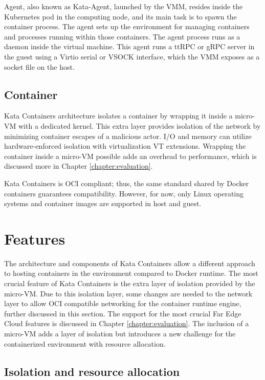 Agent, also known as Kata-Agent, launched by the VMM, resides inside the Kubernetes pod in the computing node, and its main task is to spawn the container process. The agent sets up the environment for managing containers and processes running within those containers. The agent process runs as a daemon inside the virtual machine. This agent runs a ttRPC or gRPC server in the guest using a Virtio serial or VSOCK interface, which the VMM exposes as a socket file on the host. \cite{KataContainersArchitecture}

\subsection{Container}

Kata Containers architecture isolates a container by wrapping it inside a micro-VM with a dedicated kernel. This extra layer provides isolation of the network by minimizing container escapes of a malicious actor. I/O and memory can utilize hardware-enforced isolation with virtualization VT extensions. Wrapping the container inside a micro-VM possible adds an overhead to performance, which is discussed more in Chapter \ref{chapter:evaluation}. \cite{KataContainers}

Kata Containers is OCI compliant; thus, the same standard shared by Docker containers guarantees compatibility. However, for now, only Linux operating systems and container images are supported in host and guest.

\section{Features}

The architecture and components of Kata Containers allow a different approach to hosting containers in the environment compared to Docker runtime. The most crucial feature of Kata Containers is the extra layer of isolation provided by the micro-VM. Due to this isolation layer, some changes are needed to the network layer to allow OCI compatible networking for the container runtime engine, further discussed in this section. The support for the most crucial Far Edge Cloud features is discussed in Chapter \ref{chapter:evaluation}. The inclusion of a micro-VM adds a layer of isolation but introduces a new challenge for the containerized environment with resource allocation.

\subsection{Isolation and resource allocation}

